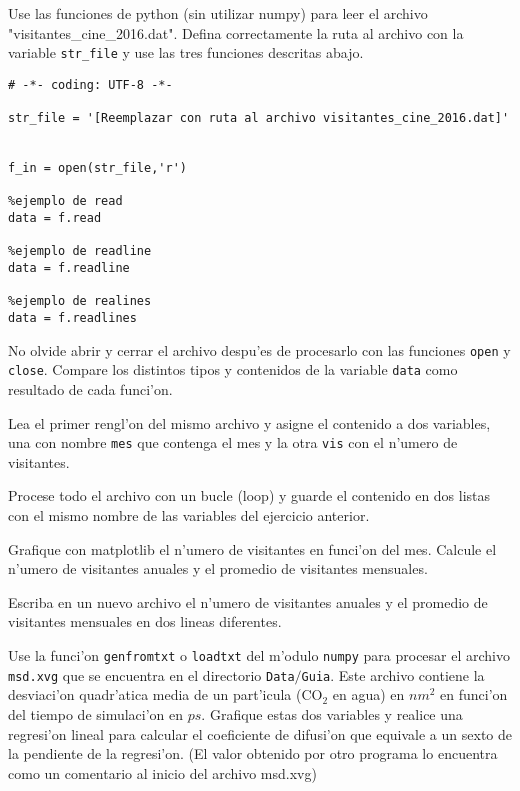 \documentclass[11pt]{exam}
\begin{document}
\begin{questions}



\item Use las funciones de python (sin utilizar numpy) para leer el archivo "visitantes\_cine\_2016.dat". Defina correctamente la ruta al archivo con la variable \texttt{str\_file} y use las tres funciones descritas abajo.

\begin{verbatim}
# -*- coding: UTF-8 -*-

str_file = '[Reemplazar con ruta al archivo visitantes_cine_2016.dat]'


f_in = open(str_file,'r')

%ejemplo de read
data = f.read

%ejemplo de readline
data = f.readline

%ejemplo de realines
data = f.readlines
\end{verbatim}
No olvide abrir y cerrar el archivo despu'es de procesarlo con las funciones \texttt{open} y \texttt{close}. Compare los distintos tipos y contenidos de la variable \texttt{data} como resultado de cada funci'on.

\item Lea el primer rengl'on del mismo archivo y asigne el contenido a dos variables, una con nombre \texttt{mes} que contenga el mes y la otra \texttt{vis} con el n'umero de visitantes.

\item Procese todo el archivo con un bucle (loop) y guarde el contenido en dos listas con el mismo nombre de las variables del ejercicio anterior.

\item Grafique con matplotlib el n'umero de visitantes en funci'on del mes. Calcule el n'umero de visitantes anuales y el promedio de visitantes mensuales.

\item Escriba en un nuevo archivo el n'umero de visitantes anuales y el promedio de visitantes mensuales en dos lineas diferentes.

\item Use la funci'on \texttt{genfromtxt} o \texttt{loadtxt} del m'odulo \texttt{numpy} para procesar el archivo \texttt{msd.xvg} que se encuentra en el directorio \texttt{Data$/$Guia}. Este archivo contiene la desviaci'on quadr'atica media de un part'icula (CO$_{2}$ en agua) en $nm^2$ en funci'on del tiempo de simulaci'on en $ps$. Grafique estas dos variables y realice una regresi'on lineal para calcular el coeficiente de difusi'on que equivale a un sexto de la pendiente de la regresi'on. (El valor obtenido por otro programa lo encuentra como un comentario al inicio del archivo msd.xvg)
	

\end{questions}
\end{document}
